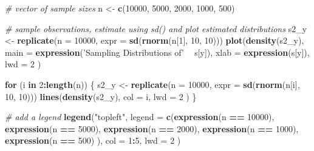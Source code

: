 \documentclass[]{book}
\newenvironment{Shaded}{\begin{snugshade}}{\end{snugshade}}
\newcommand{\KeywordTok}[1]{\textcolor[rgb]{0.13,0.29,0.53}{\textbf{#1}}}
\newcommand{\DataTypeTok}[1]{\textcolor[rgb]{0.13,0.29,0.53}{#1}}
\newcommand{\DecValTok}[1]{\textcolor[rgb]{0.00,0.00,0.81}{#1}}
\newcommand{\StringTok}[1]{\textcolor[rgb]{0.31,0.60,0.02}{#1}}
\newcommand{\CommentTok}[1]{\textcolor[rgb]{0.56,0.35,0.01}{\textit{#1}}}
\newcommand{\ControlFlowTok}[1]{\textcolor[rgb]{0.13,0.29,0.53}{\textbf{#1}}}
\newcommand{\OperatorTok}[1]{\textcolor[rgb]{0.81,0.36,0.00}{\textbf{#1}}}
\newcommand{\NormalTok}[1]{#1}
\theoremstyle{definition}
\theoremstyle{definition}
\theoremstyle{definition}
\theoremstyle{remark}
\begin{document}
\begin{Shaded}
\begin{Highlighting}[]
\CommentTok{# vector of sample sizes}
\NormalTok{n <-}\StringTok{ }\KeywordTok{c}\NormalTok{(}\DecValTok{10000}\NormalTok{, }\DecValTok{5000}\NormalTok{, }\DecValTok{2000}\NormalTok{, }\DecValTok{1000}\NormalTok{, }\DecValTok{500}\NormalTok{)}

\CommentTok{# sample observations, estimate using sd() and plot estimated distributions}
\NormalTok{s2_y <-}\StringTok{ }\KeywordTok{replicate}\NormalTok{(}\DataTypeTok{n =} \DecValTok{10000}\NormalTok{, }\DataTypeTok{expr =} \KeywordTok{sd}\NormalTok{(}\KeywordTok{rnorm}\NormalTok{(n[}\DecValTok{1}\NormalTok{], }\DecValTok{10}\NormalTok{, }\DecValTok{10}\NormalTok{)))}
\KeywordTok{plot}\NormalTok{(}\KeywordTok{density}\NormalTok{(s2_y),}
     \DataTypeTok{main =} \KeywordTok{expression}\NormalTok{(}\StringTok{'Sampling Distributions of'} \OperatorTok{~}\StringTok{ }\NormalTok{s[y]),}
     \DataTypeTok{xlab =} \KeywordTok{expression}\NormalTok{(s[y]),}
     \DataTypeTok{lwd =} \DecValTok{2}
\NormalTok{     )}

\ControlFlowTok{for}\NormalTok{ (i }\ControlFlowTok{in} \DecValTok{2}\OperatorTok{:}\KeywordTok{length}\NormalTok{(n)) \{}
\NormalTok{  s2_y <-}\StringTok{ }\KeywordTok{replicate}\NormalTok{(}\DataTypeTok{n =} \DecValTok{10000}\NormalTok{, }\DataTypeTok{expr =} \KeywordTok{sd}\NormalTok{(}\KeywordTok{rnorm}\NormalTok{(n[i], }\DecValTok{10}\NormalTok{, }\DecValTok{10}\NormalTok{)))}
  \KeywordTok{lines}\NormalTok{(}\KeywordTok{density}\NormalTok{(s2_y), }
        \DataTypeTok{col =}\NormalTok{ i, }
        \DataTypeTok{lwd =} \DecValTok{2}
\NormalTok{        )}
\NormalTok{\}}

\CommentTok{# add a legend}
\KeywordTok{legend}\NormalTok{(}\StringTok{"topleft"}\NormalTok{,}
       \DataTypeTok{legend =} \KeywordTok{c}\NormalTok{(}\KeywordTok{expression}\NormalTok{(n }\OperatorTok{==}\StringTok{ }\DecValTok{10000}\NormalTok{),}
                  \KeywordTok{expression}\NormalTok{(n }\OperatorTok{==}\StringTok{ }\DecValTok{5000}\NormalTok{),}
                  \KeywordTok{expression}\NormalTok{(n }\OperatorTok{==}\StringTok{ }\DecValTok{2000}\NormalTok{),}
                  \KeywordTok{expression}\NormalTok{(n }\OperatorTok{==}\StringTok{ }\DecValTok{1000}\NormalTok{),}
                  \KeywordTok{expression}\NormalTok{(n }\OperatorTok{==}\StringTok{ }\DecValTok{500}\NormalTok{)}
\NormalTok{       ), }
       \DataTypeTok{col =} \DecValTok{1}\OperatorTok{:}\DecValTok{5}\NormalTok{,}
       \DataTypeTok{lwd =} \DecValTok{2}
\NormalTok{)}
\end{Highlighting}
\end{Shaded}
\end{document}
